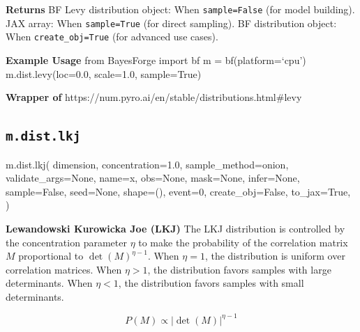 \documentclass[
  letterpaper,
  DIV=11,
  numbers=noendperiod]{scrartcl}
\newenvironment{Shaded}{\begin{snugshade}}{\end{snugshade}}
\newcommand{\DecValTok}[1]{\textcolor[rgb]{0.68,0.00,0.00}{#1}}
\newcommand{\FloatTok}[1]{\textcolor[rgb]{0.68,0.00,0.00}{#1}}
\newcommand{\NormalTok}[1]{\textcolor[rgb]{0.00,0.23,0.31}{#1}}
\newcommand{\OperatorTok}[1]{\textcolor[rgb]{0.37,0.37,0.37}{#1}}
\newcommand{\StringTok}[1]{\textcolor[rgb]{0.13,0.47,0.30}{#1}}
\newcommand{\VariableTok}[1]{\textcolor[rgb]{0.07,0.07,0.07}{#1}}
\begin{document}
\textbf{Returns} BF Levy distribution object: When \texttt{sample=False}
(for model building). JAX array: When \texttt{sample=True} (for direct
sampling). BF distribution object: When \texttt{create\_obj=True} (for
advanced use cases).

\textbf{Example Usage} from BayesForge import bf m = bf(platform=`cpu')
m.dist.levy(loc=0.0, scale=1.0, sample=True)

\textbf{Wrapper of}
https://num.pyro.ai/en/stable/distributions.html\#levy

\subsection{\texorpdfstring{\texttt{m.dist.lkj}}{m.dist.lkj}}\label{lkj}

\begin{Shaded}
\begin{Highlighting}[]
\NormalTok{m.dist.lkj(}
\NormalTok{    dimension,}
\NormalTok{    concentration}\OperatorTok{=}\FloatTok{1.0}\NormalTok{,}
\NormalTok{    sample\_method}\OperatorTok{=}\StringTok{\textquotesingle{}onion\textquotesingle{}}\NormalTok{,}
\NormalTok{    validate\_args}\OperatorTok{=}\VariableTok{None}\NormalTok{,}
\NormalTok{    name}\OperatorTok{=}\StringTok{\textquotesingle{}x\textquotesingle{}}\NormalTok{,}
\NormalTok{    obs}\OperatorTok{=}\VariableTok{None}\NormalTok{,}
\NormalTok{    mask}\OperatorTok{=}\VariableTok{None}\NormalTok{,}
\NormalTok{    infer}\OperatorTok{=}\VariableTok{None}\NormalTok{,}
\NormalTok{    sample}\OperatorTok{=}\VariableTok{False}\NormalTok{,}
\NormalTok{    seed}\OperatorTok{=}\VariableTok{None}\NormalTok{,}
\NormalTok{    shape}\OperatorTok{=}\NormalTok{(),}
\NormalTok{    event}\OperatorTok{=}\DecValTok{0}\NormalTok{,}
\NormalTok{    create\_obj}\OperatorTok{=}\VariableTok{False}\NormalTok{,}
\NormalTok{    to\_jax}\OperatorTok{=}\VariableTok{True}\NormalTok{,}
\NormalTok{)}
\end{Highlighting}
\end{Shaded}

\textbf{Lewandowski Kurowicka Joe (LKJ)} The LKJ distribution is
controlled by the concentration parameter \(\eta\) to make the
probability of the correlation matrix \(M\) proportional to
\(\det(M)^{\eta - 1}\). When \(\eta = 1\), the distribution is uniform
over correlation matrices. When \(\eta > 1\), the distribution favors
samples with large determinants. When \(\eta < 1\), the distribution
favors samples with small determinants.

\[
     P(M) \propto |\det(M)|^{\eta - 1}
  \]
\end{document}
